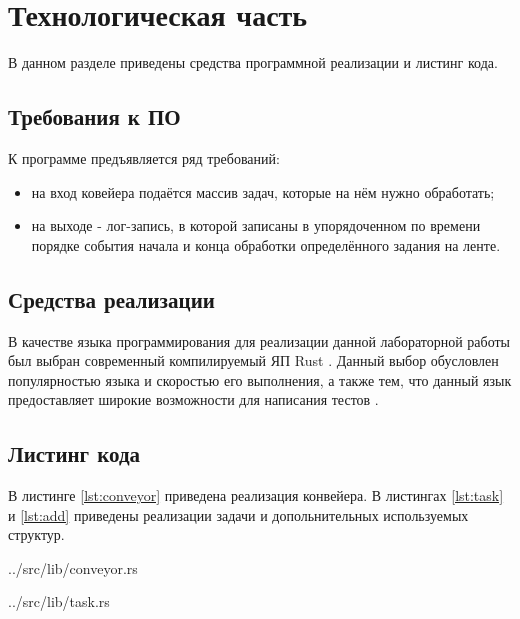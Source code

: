 \chapter{Технологическая часть}

В данном разделе приведены средства программной реализации и листинг кода.

\section{Требования к ПО}

К программе предъявляется ряд требований:
\begin{itemize}
    \item на вход ковейера подаётся массив задач, которые на нём нужно обработать;
	\item на выходе - лог-запись, в которой записаны в упорядоченном по времени порядке события начала и конца обработки определённого задания на ленте.
\end{itemize}

\section{Средства реализации}

В качестве языка программирования для реализации данной лабораторной работы был выбран современный компилируемый ЯП Rust \cite{rustlang}. Данный выбор обусловлен популярностью языка и скоростью его выполнения, а также тем, что данный язык предоставляет широкие возможности для написания тестов \cite{rusttest}.

\section{Листинг кода}

В листинге \ref{lst:conveyor} приведена реализация конвейера. В листингах \ref{lst:task} и \ref{lst:add} приведены реализации задачи и допольнительных используемых структур.

\begin{lstinputlisting}[
	caption={Реализация конвейера},
	label={lst:conveyor},
	style={rust}
]{../src/lib/conveyor.rs}
\end{lstinputlisting}

\begin{lstinputlisting}[
	caption={Структура задачи},
	label={lst:task},
	style={rust},
    linerange={1-152}
]{../src/lib/task.rs}
\end{lstinputlisting}

